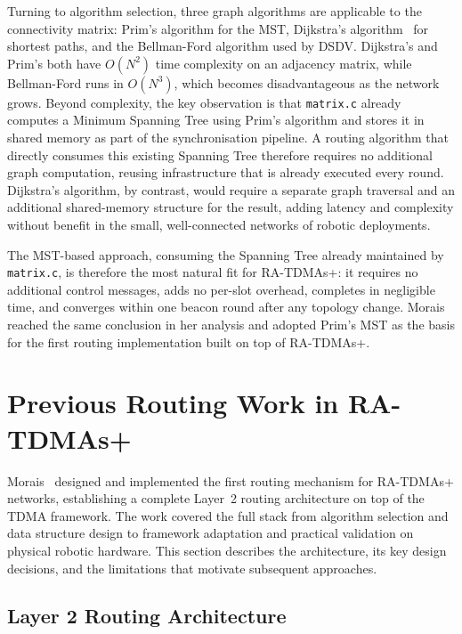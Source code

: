 Turning to algorithm selection, three graph algorithms are applicable to the connectivity matrix: Prim's algorithm for the
MST, Dijkstra's algorithm~\cite{dijkstra1959note} for shortest paths, and the Bellman-Ford
algorithm used by DSDV.
Dijkstra's and Prim's both have $O(N^2)$ time complexity on an adjacency matrix, while
Bellman-Ford runs in $O(N^3)$, which becomes disadvantageous as the network grows.
Beyond complexity, the key observation is that \texttt{matrix.c} already computes a Minimum
Spanning Tree using Prim's algorithm and stores it in shared memory as part of the
synchronisation pipeline. A routing algorithm that directly consumes this existing Spanning
Tree therefore requires no additional graph computation, reusing infrastructure that is already
executed every round. Dijkstra's algorithm, by contrast, would require a separate graph
traversal and an additional shared-memory structure for the result, adding latency and
complexity without benefit in the small, well-connected networks of robotic deployments.

The MST-based approach, consuming the Spanning Tree already maintained by
\texttt{matrix.c}, is therefore the most natural fit for RA-TDMAs+: it requires no additional
control messages, adds no per-slot overhead, completes in negligible time, and converges within
one beacon round after any topology change. Morais~\cite{morais2024synchronization}
reached the same conclusion in her analysis and adopted Prim's MST as the basis for the first
routing implementation built on top of RA-TDMAs+.


\section{Previous Routing Work in RA-TDMAs+}
\label{sec:related-work}

Morais~\cite{morais2024synchronization} designed and implemented the first routing mechanism
for RA-TDMAs+ networks, establishing a complete Layer~2 routing architecture on top of the
TDMA framework. The work covered the full stack from algorithm selection and data structure
design to framework adaptation and practical validation on physical robotic hardware. This
section describes the architecture, its key design decisions, and the limitations that motivate
subsequent approaches.

\subsection{Layer 2 Routing Architecture}


